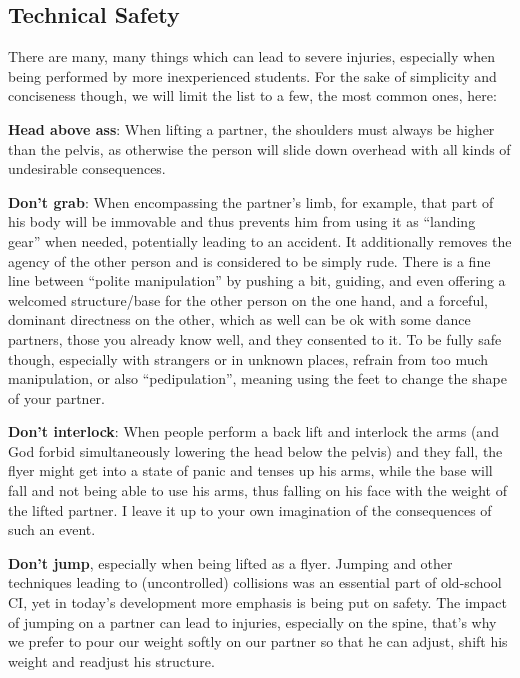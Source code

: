 \subsection{Technical Safety}\label{subsec:technical-safety}

There are many, many things which can lead to severe injuries, especially when being performed by more inexperienced students.
For the sake of simplicity and conciseness though, we will limit the list to a few, the most common ones, here:

\vspace{10pt}

\noindent \textbf{Head above ass}: When lifting a partner, the shoulders must always be higher than the pelvis, as otherwise the person will slide down overhead with all kinds of undesirable consequences.

\vspace{5pt}
\noindent \textbf{Don't grab}: When encompassing the partner's limb, for example, that part of his body will be immovable and thus prevents him from using it as ``landing gear'' when needed, potentially leading to an accident.
It additionally removes the agency of the other person and is considered to be simply rude.
There is a fine line between ``polite manipulation'' by pushing a bit, guiding, and even offering a welcomed structure/base for the other person on the one hand, and a forceful, dominant directness on the other, which as well can be ok with some dance partners, those you already know well, and they consented to it.
To be fully safe though, especially with strangers or in unknown places, refrain from too much manipulation, or also ``pedipulation'', meaning using the feet to change the shape of your partner.

\vspace{5pt}
\noindent \textbf{Don't interlock}: When people perform a back lift and interlock the arms (and God forbid simultaneously lowering the head below the pelvis) and they fall, the flyer might get into a state of panic and tenses up his arms, while the base will fall and not being able to use his arms, thus falling on his face with the weight of the lifted partner.
I leave it up to your own imagination of the consequences of such an event.

\vspace{5pt}
\noindent \textbf{Don't jump}, especially when being lifted as a flyer.
Jumping and other techniques leading to (uncontrolled) collisions was an essential part of old-school CI, yet in today's development more emphasis is being put on safety.
The impact of jumping on a partner can lead to injuries, especially on the spine, that's why we prefer to pour our weight softly on our partner so that he can adjust, shift his weight and readjust his structure.

